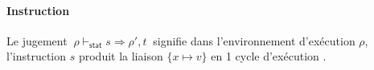 \documentclass[11pt]{article}
\newcommand{\kw}[1]{\textbf{#1}}
\newcommand{\bigStep}[4]{#1 \vdash_{\textsf{#2}} #3 \Rightarrow #4}
\newcommand{\GTBsemStat}[3]{\bigStep{#1}{stat}{#2}{#3}}
\newcommand{\GTBsemAtom}[3]{\bigStep{#1}{atom}{#2}{#3}}
\begin{document}
\paragraph{Instruction}
Le jugement $~\GTBsemStat{\rho}{s}{\rho',t}~$ signifie \og 
dans l'environnement d'exécution $\rho$, l'instruction $s$ 
produit la liaison $\{x \mapsto v\}$ en 1 cycle d'exécution \fg.

\end{document}
